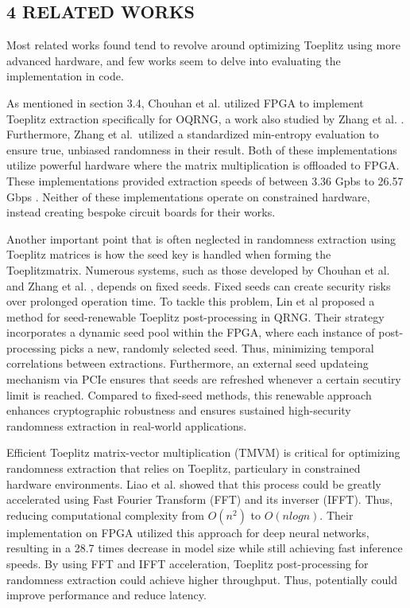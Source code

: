 \documentclass{sigchi}
\begin{document}
\subsection{\texorpdfstring{4 RELATED WORKS }{4 RELATED WORKS }}\label{related-works}

Most related works found tend to revolve around optimizing Toeplitz using more advanced hardware, and few works seem to delve into evaluating the implementation in code.

As mentioned in section 3.4, Chouhan et al. \cite{toeplitz-desc} utilized FPGA to implement Toeplitz extraction specifically for OQRNG, a work also studied by Zhang et al. \cite{toeplitz}. Furthermore, Zhang et al.~utilized a standardized min-entropy evaluation to ensure true, unbiased randomness in their result. Both of these implementations utilize powerful hardware where the matrix multiplication is offloaded to FPGA. These implementations provided extraction speeds of between 3.36 Gpbs \cite{toeplitz} to 26.57 Gbps \cite{toeplitz-desc}. Neither of these implementations operate on constrained hardware, instead creating bespoke circuit boards for their works.

Another important point that is often neglected in randomness extraction using Toeplitz matrices is how the seed key is handled when forming the Toeplitzmatrix. Numerous systems, such as those developed by Chouhan et al. \cite{toeplitz-desc} and Zhang et al. \cite{toeplitz}, depends on fixed seeds. Fixed seeds can create security risks over prolonged operation time. To tackle this problem, Lin et al \cite{lin} proposed a method for seed-renewable Toeplitz post-processing in QRNG. Their strategy incorporates a dynamic seed pool within the FPGA, where each instance of post-processing picks a new, randomly selected seed. Thus, minimizing temporal correlations between extractions. Furthermore, an external seed updateing mechanism via PCIe ensures that seeds are refreshed whenever a certain secutiry limit is reached. Compared to fixed-seed methods, this renewable approach enhances cryptographic robustness and ensures sustained high-security randomness extraction in real-world applications.

Efficient Toeplitz matrix-vector multiplication (TMVM) is critical for optimizing randomness extraction that relies on Toeplitz, particulary in constrained hardware environments. Liao et al. \cite{liao} showed that this process could be greatly accelerated using Fast Fourier Transform (FFT) and its inverser (IFFT). Thus, reducing computational complexity from \(O(n^2)\) to \(O(n log n)\). Their implementation on FPGA utilized this approach for deep neural networks, resulting in a 28.7 times decrease in model size while still achieving fast inference speeds. By using FFT and IFFT acceleration, Toeplitz post-processing for randomness extraction could achieve higher throughput. Thus, potentially could improve performance and reduce latency.
\end{document}
